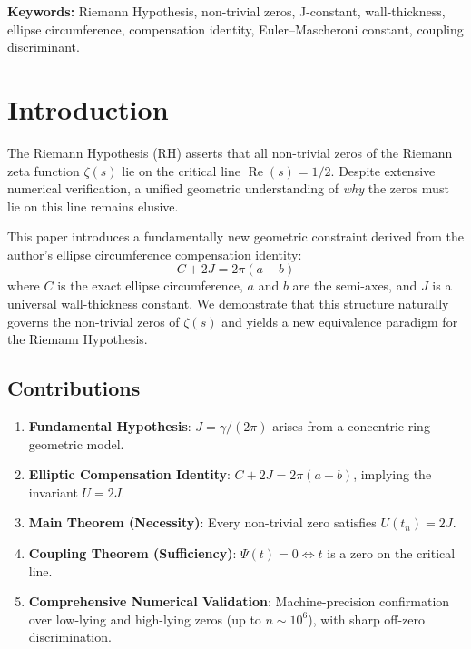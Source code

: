 \documentclass[11pt,a4paper]{article}
\theoremstyle{definition}
\begin{document}
\begin{titlepage}
\vspace{0.5cm}

\noindent\textbf{Keywords:} Riemann Hypothesis, non-trivial zeros, J-constant, wall-thickness, ellipse circumference, compensation identity, Euler--Mascheroni constant, coupling discriminant.

\end{titlepage}

\tableofcontents
\newpage

\section{Introduction}\label{sec:intro}

The Riemann Hypothesis (RH) asserts that all non-trivial zeros of the Riemann zeta function \(\zeta(s)\) lie on the critical line \(\operatorname{Re}(s) = 1/2\). 
Despite extensive numerical verification, a unified geometric understanding of \emph{why} the zeros must lie on this line remains elusive.

This paper introduces a fundamentally new geometric constraint derived from the author's ellipse circumference compensation identity:
\begin{equation}\label{eq:compensation}
C + 2J = 2\pi(a-b)
\end{equation}
where \(C\) is the exact ellipse circumference, \(a\) and \(b\) are the semi-axes, and \(J\) is a universal wall-thickness constant. 
We demonstrate that this structure naturally governs the non-trivial zeros of \(\zeta(s)\) and yields a new equivalence paradigm for the Riemann Hypothesis.

\subsection{Contributions}
\begin{enumerate}[leftmargin=2em]
    \item \textbf{Fundamental Hypothesis}: \(J = \gamma/(2\pi)\) arises from a concentric ring geometric model.
    \item \textbf{Elliptic Compensation Identity}: \(C + 2J = 2\pi(a-b)\), implying the invariant \(U = 2J\).
    \item \textbf{Main Theorem (Necessity)}: Every non-trivial zero satisfies \(U(t_n) = 2J\).
    \item \textbf{Coupling Theorem (Sufficiency)}: \(\Psi(t) = 0 \iff t\) is a zero on the critical line.
    \item \textbf{Comprehensive Numerical Validation}: Machine-precision confirmation over low-lying and high-lying zeros (up to \(n \sim 10^6\)), with sharp off-zero discrimination.
\end{enumerate}
\end{document}
